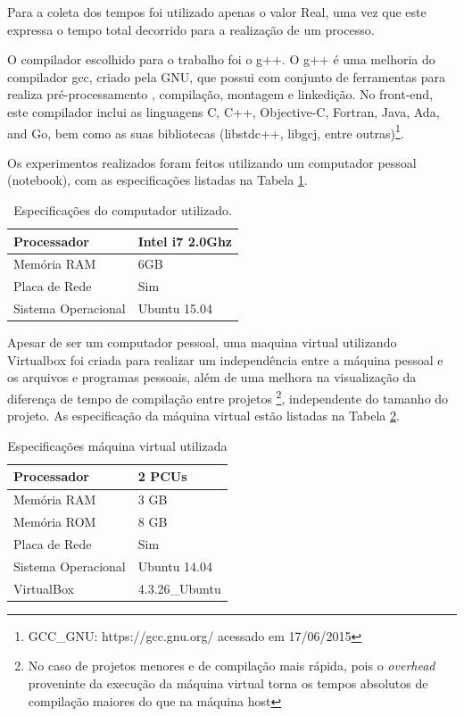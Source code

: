 Para a coleta dos tempos foi utilizado apenas o valor Real, uma vez que este
 expressa o tempo total decorrido para a realização de um processo.

O compilador escolhido para o trabalho foi o g++. O g++ é uma melhoria do
 compilador gcc, criado pela GNU, que possui com conjunto de ferramentas
 para realiza pré-processamento , compilação, montagem e linkedição.
 No front-end,  este compilador inclui as linguagens C, C++, Objective-C,
 Fortran, Java, Ada, and Go, bem como as suas bibliotecas  (libstdc++,
 libgcj, entre outras)\footnote{GCC\_GNU: https://gcc.gnu.org/ acessado
 em 17/06/2015}.


Os experimentos realizados foram feitos utilizando um computador pessoal
 (notebook), com  as especificações  listadas na Tabela 
\ref{tab:especificacoes_hardware}.


\begin{table}[h]
\centering
\begin{tabular}{|l|l|}
	\hline
	Processador         & Intel i7 2.0Ghz \\
	\hline
	Memória RAM         & 6GB             \\
	\hline
	Placa de Rede       & Sim             \\
	\hline
	Sistema Operacional & Ubuntu 15.04 \\
	\hline
\end{tabular}
\caption{Especificações do computador utilizado.}
\label{tab:especificacoes_hardware}
\end{table}


Apesar de ser um computador pessoal, uma maquina virtual utilizando Virtualbox
 foi criada para realizar um independência entre a máquina pessoal e os
 arquivos e programas pessoais, além de uma melhora  na visualização da
 diferença de tempo de compilação entre projetos
 \footnote{No caso de projetos menores e de compilação mais rápida, pois o 
\textit{overhead} proveninte da execução da máquina virtual torna os tempos
 absolutos de compilação maiores do que na máquina host}, independente do
 tamanho do projeto. As especificação da máquina virtual  estão listadas na
 Tabela \ref{tab:especificacoes_vm}.

\begin{table}[h]
	\centering
	\begin{tabular}{|l|l|}
		\hline
		Processador & 2 PCUs \\
		\hline
		Memória RAM & 3 GB \\
		\hline
		Memória ROM & 8 GB \\
		\hline
		Placa de Rede & Sim \\
		\hline
		Sistema Operacional & Ubuntu 14.04 \\
		\hline
		VirtualBox & 4.3.26\_Ubuntu \\
		\hline
	\end{tabular}
	\caption{Especificações máquina virtual utilizada}
	\label{tab:especificacoes_vm}
\end{table}


